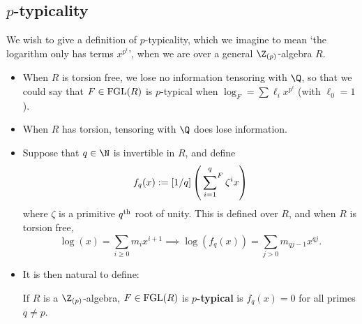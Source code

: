 \documentclass[11pt]{article}
\newcommand\Fsum{\sideset{}{^F}\sum}
\begin{document}
\begin{Formal Group Laws}
\subsection*{$p$-typicality}
\begin{itemise}
\item We wish to give a definition of $p$-typicality, which we imagine to mean `the logarithm only has terms $x^{p^i}$', when we are over a general $\Z_{(p)}$-algebra $R$.
\begin{itemize}\squishlist
\item When $R$ is torsion free, we lose no information tensoring with $\Q$, so that we could say that $F\in\textup{FGL}(R)$ is $p$-typical when $\log_{F}=\sum\ell_ix^{p^i}$ (with $\ell_0=1$).
\item When $R$ has torsion, tensoring with $\Q$ does lose information.
\item Suppose that $q\in\N$ is invertible in $R$, and define
\[f_q(x):=[1/q]\left(\Fsum_{i=1}^q\zeta^ix\right)\]
where $\zeta$ is a primitive $q^\textup{th}$ root of unity. This is defined over $R$, and when $R$ is torsion free,
\[\log(x)=\sum_{i\geq0}m_ix^{i+1}\implies \log(f_q(x))=\sum_{j>0}m_{qj-1}x^{qj}.\]
\item It is then natural to define:
\begin{defn*}
If $R$ is a $\Z_{(p)}$-algebra, $F\in\textup{FGL}(R)$ is \textbf{$p$-typical} is $f_{q}(x)=0$ for all primes $q\neq p$.
\end{defn*}
\end{itemize}
\item 




\end{itemise}
\end{Formal Group Laws}
\end{document}
